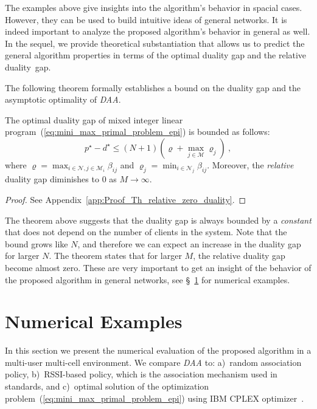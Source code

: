 \documentclass[journal, 10pt, twocolumn]{IEEEtran}
\newcommand{\be}{\begin{equation}}
\newcommand{\ee}{\end{equation}}
\begin{document}
The examples above give insights into the algorithm's behavior in spacial cases. However, they can be used to build intuitive ideas of general networks. It is indeed important to analyze the proposed algorithm's behavior in general as well. In the sequel, we provide theoretical substantiation that allows us to predict the general algorithm properties in terms of the optimal duality gap and the relative duality~gap.

The following theorem formally establishes a bound on the duality gap and the asymptotic optimality of \emph{DAA}.

\begin{theorem}\label{thm:duality_gap_tends_to_zero}
The optimal duality gap of mixed integer linear program~(\ref{eq:mini_max_primal_problem_epi}) is bounded as follows:
\be\label{eq:bound_last_inside_theorem}
p^\star-d^\star \leq (N+1)(\varrho + \max_{j\in\mathcal{M}}\varrho_j) \ ,
\ee
where $\varrho=\max_{i\in\mathcal{N},{j}\in \mathcal{M}_i}\beta_{i{j}}$ and $\varrho_j=\min_{i\in\mathcal{N}_j}\beta_{ij}$. Moreover, the \emph{relative} duality gap diminishes to $0$ as $M\rightarrow\infty$.
\end{theorem}
\begin{proof}
See Appendix~\ref{app:Proof_Th_relative_zero_duality}.
\end{proof}
The theorem above suggests that the duality gap is always bounded by a \emph{constant} that does not depend on the number of clients in the system. Note that the bound grows like $N$, and therefore we can expect an increase in the duality gap for larger $N$. The theorem states that for larger $M$, the relative duality gap become almost zero. These are very important to get an insight of the behavior of the proposed algorithm in general networks, see \S~\ref{sec:numerical_results} for numerical examples.



\section{Numerical Examples}\label{sec:numerical_results}
In this section we present the numerical evaluation of the proposed algorithm in a multi-user multi-cell environment. We compare \emph{DAA} to: a)~random association policy, b)~RSSI-based policy, which is the association mechanism used in standards, and c)~optimal solution of the optimization problem~(\ref{eq:mini_max_primal_problem_epi}) using IBM CPLEX optimizer~\cite{CPLEX}.
\end{document}
